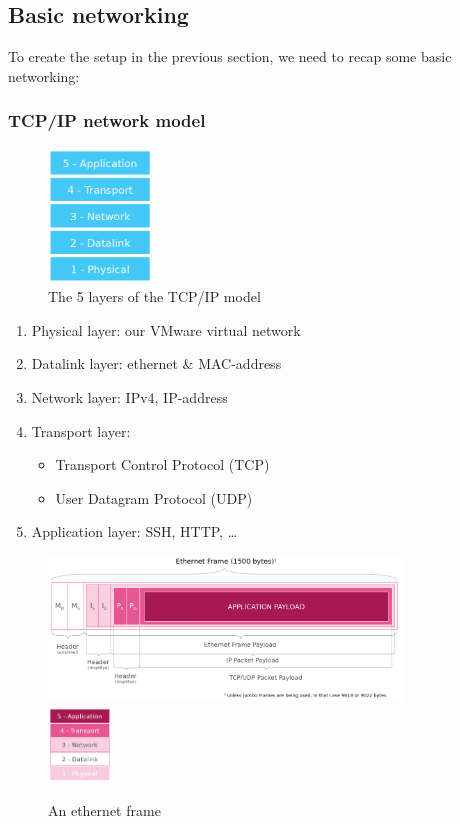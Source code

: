 \documentclass{article}
\begin{document}
\subsection{Basic networking}

To create the setup in the previous section, we need to recap some basic networking:

\subsubsection{TCP/IP network model}

\begin{figure}[H]
    \centering
    \includegraphics[width=0.25\textwidth]{tcp-ip.png}
    \caption{The 5 layers of the TCP/IP model}
\end{figure}

\begin{enumerate}
    \item Physical layer: our VMware virtual network
    \item Datalink layer: ethernet \& MAC-address
    \item Network layer: IPv4, IP-address
    \item Transport layer:
    \begin{itemize}
        \item Transport Control Protocol (TCP)
        \item User Datagram Protocol (UDP)
    \end{itemize}
    \item Application layer: SSH, HTTP, \dots
\end{enumerate}

\begin{figure}[H]
    \centering
    \includegraphics[width=0.84\textwidth]{tcp-ip2.png}
    \includegraphics[width=0.15\textwidth]{tcp-ip3.png}
    \caption{An ethernet frame}
\end{figure}
\end{document}
